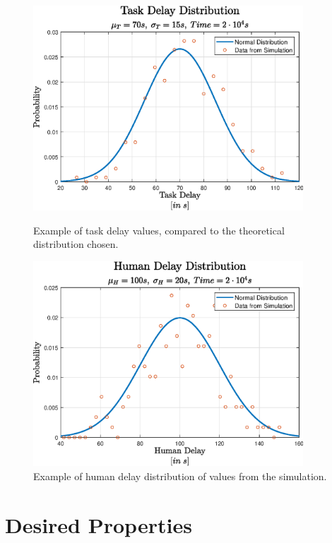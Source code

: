 \documentclass{article}
\begin{document}
			\begin{figure}[H]
				\centering
				\begin{minipage}{0.45\textwidth}
					\centering
					\includegraphics[width=0.9\textwidth]{./Images/taskDelay}
					\caption{Example of task delay values, compared to the theoretical distribution chosen.}
				\end{minipage}\hfill
				\begin{minipage}{0.45\textwidth}
					\centering
					\includegraphics[width=0.9\textwidth]{./Images/humanDelay}
					\caption{Example of human delay distribution of values from the simulation.}
				\end{minipage}
			\end{figure}
			
	\section{Desired Properties}
				
\end{document}

